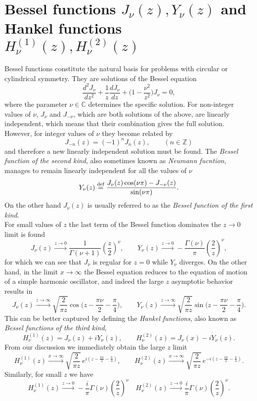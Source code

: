 \section{Bessel functions \(J_\nu(z), Y_\nu(z)\) and Hankel functions $H_\nu^{(1)}(z), H_\nu^{(2)}(z)$}
\label{app:bessel}
Bessel functions constitute the natural basis for problems with circular or cylindrical symmetry. They are solutions of the Bessel equation
\[
\frac{d^2J_\nu}{dz^2}+\frac{1}{z}\frac{dJ_\nu}{dz}+\bigg(1-\frac{\nu^2}{z^2}\bigg)J_\nu=0,
\]
where the parameter $\nu\in\mathbb C$ determines the specific solution. For non-integer values of $\nu$, $J_\nu$ and $J_{-\nu}$, which are both solutions of the above, are linearly independent, which means that their combination gives the full solution. However, for integer values of $\nu$ they become related by 
$$J_{-n}(z)=(-1)^n J_n(z), \qquad (n\in\mathbb Z) $$
and therefore a new linearly independent solution must be found. The \emph{Bessel function of the second kind}, also sometimes known as \emph{Neumann fucntion}, manages to remain linearly independent for all the values of $\nu$
$$Y_\nu(z)\stackrel{\text{def}}{=}\frac{J_\nu(z)\cos(\nu\pi)-J_{-\nu}(z)}{\sin(\nu\pi)}.$$
On the other hand $J_\nu(z)$ is usually referred to as the \emph{Bessel function of the first kind}.\\
For small values of $z$ the last term of the Bessel function dominates the $z\to0$ limit is found
\[
J_\nu(z)\xrightarrow{z\to0}\frac{1}{\Gamma(\nu+1)}\left(\frac{z}{2}\right)^\nu,\qquad
Y_\nu(z)\xrightarrow{z\to0} -\frac{\Gamma(\nu)}{\pi}\left(\frac{2}{z}\right)^\nu,
\]
for which we can see that $J_\nu$ is regular for $z=0$ while $Y_\nu$ diverges. On the other hand, in the limit $x\to \infty$ the Bessel equation reduces to the equation of motion of a simple harmonic oscillator, and indeed the large $z$ asymptotic behavior results in 
\[
J_\nu(z)\xrightarrow{z\to\infty}\sqrt{\frac{2}{\pi z}}\cos\Big(z-\frac{\pi\nu}{2}-\frac{\pi}{4}\Big),\qquad
Y_\nu(z)\xrightarrow{z\to\infty}\sqrt{\frac{2}{\pi z}}\sin\Big(z-\frac{\pi\nu}{2}-\frac{\pi}{4}\Big).
\]
This can be better captured by defining the \emph{Hankel functions}, also known as \emph{Bessel functions of the third kind},
\[
H^{(1)}_\nu(z)=J_\nu(z)+iY_\nu(z),\qquad H^{(2)}_\nu(z)=J_\nu(x)-iY_\nu(z).
\]
From our discussion we immediately obtain the large $z$ limit
\[
H^{(1)}_\nu(z)\xrightarrow{x\to\infty}\sqrt{\frac{2}{\pi z}}\,e^{i\left(z-\frac{\pi\nu}{2}-\frac{\pi}{4}\right)},
\qquad
H^{(2)}_\nu(z)\xrightarrow{x\to\infty}\sqrt{\frac{2}{\pi z}}\,e^{-i\left(z-\frac{\pi\nu}{2}-\frac{\pi}{4}\right)}.
\]
Similarly, for small $z$ we have
\[
H^{(1)}_\nu(z)\xrightarrow{z\to0} -\frac{i}{\pi}\Gamma(\nu)\left(\frac{2}{z}\right)^\nu
\quad H^{(2)}_\nu(z)\xrightarrow{z\to0} \frac{i}{\pi}\Gamma(\nu)\left(\frac{2}{z}\right)^\nu.
\]


